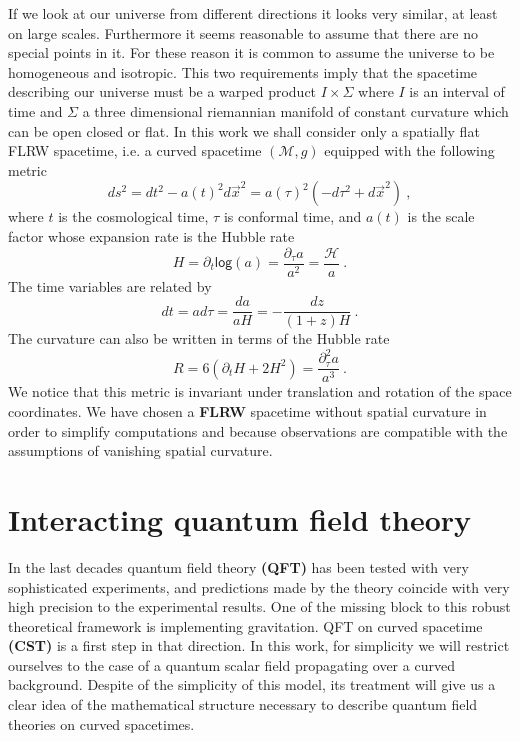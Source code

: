 \documentclass[11pt]{book}
\renewcommand{\log}{\mathsf{log}}
\newcommand{\Hcal}{\mathcal{H}}
\newcommand{\Mcal}{\mathcal{M}}
\theoremstyle{break}
\begin{document}
If we look at our universe from different directions it looks very similar, at least on large scales. Furthermore it seems reasonable to assume that there are no special points in it. For these reason it is common to assume the universe to be homogeneous and isotropic. This two requirements imply that the spacetime describing our universe must be a warped product $I\times \Sigma$ where $I$ is an interval of time and $\Sigma$ a three dimensional riemannian manifold of constant curvature which can be open closed or flat. In this work we shall consider only a spatially flat FLRW spacetime, i.e. a curved spacetime $(\Mcal,g)$ equipped with the following metric
%
\begin{equation*}
ds^2 = dt^2 - a(t)^2 d\vec{x}^2 = a(\tau)^2\left(-d\tau^2+d\vec{x}^2\right) \ ,
\end{equation*}
%
where $t$ is the cosmological time, $\tau$ is conformal time, and $a(t)$ is the scale factor whose expansion rate is the Hubble rate
%
\begin{equation*}
H = \partial_t \log (a) = \frac{\partial_\tau a}{a^2} = \frac{\Hcal}{a} \ .
\end{equation*}
%
The time variables are related by
%
\begin{equation*}
dt = a d\tau = \frac{da}{aH} = -\frac{dz}{(1+z)H} \ . 
\end{equation*}
% 
The curvature can also be written in terms of the Hubble rate
%
\begin{equation}
R=6(\partial_t H + 2 H^2)=\frac{\partial^2_\tau a}{a^3} \ . 
\label{eq:rflrw}
\end{equation}
%
We notice that this metric is invariant under translation and rotation of the space coordinates. We have chosen a \textbf{FLRW} spacetime without spatial curvature in order to simplify computations and because observations are compatible with the assumptions of vanishing spatial curvature. 


\chapter{Interacting quantum field theory}
\label{p:INT_QFT}


In the last decades quantum field theory \textbf{(QFT)} has been tested with very sophisticated experiments, and predictions made by the theory coincide with very high precision to the experimental results. One of the missing block to this robust theoretical framework is implementing gravitation. QFT on curved spacetime \textbf{(CST)} is a first step in that direction. In this work, for simplicity we will restrict ourselves to the case of a quantum scalar field propagating over a curved background. Despite of the simplicity of this model, its treatment will give us a clear idea of the mathematical structure necessary to describe quantum field theories on curved spacetimes.
\end{document}
